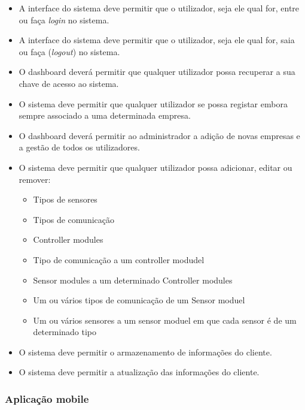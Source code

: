 \begin{itemize}
	\item A interface do sistema deve permitir que o utilizador, seja ele qual for, entre ou faça \textit{login} no sistema. 
	
	\item A interface do sistema deve permitir que o utilizador, seja ele qual for, saia ou faça (\textit{logout}) no sistema.
	
	\item O dashboard deverá permitir que qualquer utilizador possa recuperar a sua chave de acesso ao sistema.
	 
	\item O sistema deve permitir que qualquer utilizador se possa registar embora sempre associado a uma determinada empresa. 
	
	\item O dashboard deverá permitir ao administrador a adição de novas empresas e a gestão de todos os utilizadores. 
	
	\item O sistema deve permitir que qualquer utilizador possa adicionar, editar ou remover: 
	\begin{itemize}
		\item Tipos de sensores 
		\item Tipos de comunicação 
		\item Controller modules
		\item Tipo de comunicação a um controller modudel
		\item Sensor modules a um determinado Controller modules
		\item Um ou vários tipos de comunicação de um Sensor moduel
		\item Um ou vários sensores a um sensor moduel em que cada sensor é de um determinado tipo 
		
	\end{itemize}
	
	\item O sistema deve permitir o armazenamento de informações do cliente.
	
	\item O sistema deve permitir a atualização das informações do cliente.
\end{itemize}


\subsubsection{Aplicação mobile}





